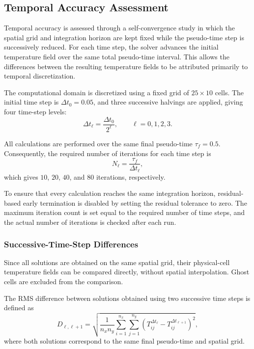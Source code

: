 \subsection{Temporal Accuracy Assessment}
\label{subsec:temporal_accuracy}

Temporal accuracy is assessed through a self-convergence study
in which the spatial grid and integration horizon are kept
fixed while the pseudo-time step is successively reduced.
For each time step, the solver advances the initial temperature
field over the same total pseudo-time interval. This allows
the differences between the resulting temperature fields to
be attributed primarily to temporal discretization.

The computational domain is discretized using a fixed grid
of $25\times10$ cells. The initial time step is
$\Delta t_0=0.05$, and three successive halvings are applied,
giving four time-step levels:
\begin{equation}
\Delta t_\ell=\frac{\Delta t_0}{2^\ell},
\qquad \ell=0,1,2,3.
\label{eq:temporal_step_refinement}
\end{equation}

All calculations are performed over the same final pseudo-time
$\tau_f=0.5$. Consequently, the required number of iterations
for each time step is
\begin{equation}
N_\ell=\frac{\tau_f}{\Delta t_\ell},
\label{eq:temporal_iteration_count}
\end{equation}
which gives $10$, $20$, $40$, and $80$ iterations,
respectively.

To ensure that every calculation reaches the same integration
horizon, residual-based early termination is disabled by
setting the residual tolerance to zero. The maximum iteration
count is set equal to the required number of time steps, and
the actual number of iterations is checked after each run.

\subsubsection{Successive-Time-Step Differences}

Since all solutions are obtained on the same spatial grid,
their physical-cell temperature fields can be compared
directly, without spatial interpolation. Ghost cells are
excluded from the comparison.

The RMS difference between solutions obtained using two
successive time steps is defined as
\begin{equation}
D_{\ell,\ell+1}
=
\sqrt{
\frac{1}{n_xn_y}
\sum_{i=1}^{n_x}
\sum_{j=1}^{n_y}
\left(
T_{ij}^{\Delta t_\ell}
-
T_{ij}^{\Delta t_{\ell+1}}
\right)^2
},
\label{eq:temporal_difference_norm}
\end{equation}
where both solutions correspond to the same final pseudo-time
and spatial grid.

